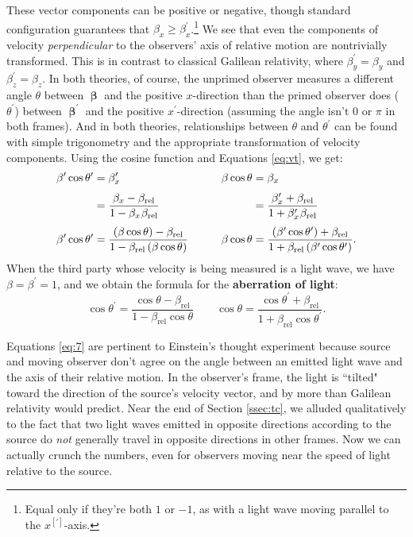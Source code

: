 \documentclass[12pt]{article}
\newcommand{\vvbeta}{\bm{\upbeta}}
\begin{document}
These vector components can be positive or negative, though standard configuration guarantees that $ \beta_x \geq \beta_x^\prime $.\footnote{Equal only if they're both $1$ or $-1$, as with a light wave moving parallel to the $x^{[\prime]}$-axis.} We see that even the components of velocity \emph{perpendicular} to the observers' axis of relative motion are nontrivially transformed. This is in contrast to classical Galilean relativity, where $\beta_y^{\prime} = \beta_y$ and $\beta_z^{\prime} = \beta_z$. In both theories, of course, the unprimed observer measures a different angle $\theta$ between $\vvbeta$ and the positive $x$-direction than the primed observer does ($\theta^\prime$) between $\vvbeta^{\prime}$ and the positive $x^\prime$-direction (assuming the angle isn't $0$ or $\pi$ in both frames). And in both theories, relationships between $\theta$ and $\theta^{\prime}$ can be found with simple trigonometry and the appropriate transformation of velocity components. Using the cosine function and Equations \ref{eq:vt}, we get:
\begin{equation*}
\begin{aligned}
\beta^\prime \cos \theta^\prime &= \beta_x^\prime &\qquad \beta \cos \theta &= \beta_x \\[3pt]
&= \dfrac{\beta_x - \beta_{\textrm{rel}}}{1 - \beta_{x} \mkern1mu \beta_{\textrm{rel}}} &\qquad &= \dfrac{\beta_x^\prime + \beta_{\textrm{rel}}}{1 + \beta_x^\prime \mkern1mu \beta_{\textrm{rel}}} \\[3pt]
\beta^\prime \cos \theta^\prime &= \frac{\left( \beta \cos \theta \right) - \beta_{\textrm{rel}}}{1 - \beta_{\textrm{rel}} \left( \beta \cos \theta \right)} &\qquad \beta \cos \theta &=\frac{\left( \beta^\prime \cos \theta^\prime \right) + \beta_{\textrm{rel}}}{1 + \beta_{\textrm{rel}} \left( \beta^\prime \cos \theta^\prime \right)} .
\end{aligned}
\end{equation*}
When the third party whose velocity is being measured is a light wave, we have $\beta = \beta^\prime = 1$, and we obtain the formula for the \textbf{aberration of light}:
\begin{equation}\label{eq:7}
\cos \theta^\prime =\frac{\cos \theta - \beta_{\textrm{rel}}}{1 - \beta_{\textrm{rel}} \cos \theta} \qquad \cos \theta =\frac{\cos \theta^\prime + \beta_{\textrm{rel}}}{1 + \beta_{\textrm{rel}} \cos \theta^\prime}.
\end{equation}

Equations \ref{eq:7} are pertinent to Einstein's thought experiment because source and moving observer don't agree on the angle between an emitted light wave and the axis of their relative motion. In the observer's frame, the light is ``tilted" toward the direction of the source's velocity vector, and by more than Galilean relativity would predict. Near the end of Section \ref{ssec:tc}, we alluded qualitatively to the fact that two light waves emitted in opposite directions according to the source do \emph{not} generally travel in opposite directions in other frames. Now we can actually crunch the numbers, even for observers moving near the speed of light relative to the source.
\end{document}
